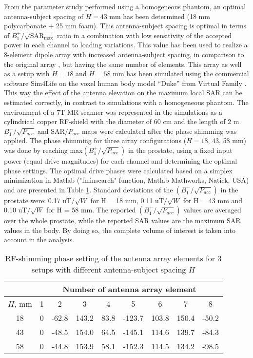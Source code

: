 \documentclass[fleqn,10pt]{wlscirep}
\begin{document}
From the parameter study performed using a homogeneous phantom, an optimal antenna-subject spacing of $H=43$ mm has been determined (18 mm polycarbonate + 25 mm foam). This antenna-subject spacing is optimal in terms of $B_1^{+}/\sqrt{\text{SAR}_{\text{max}}}$ ratio in a combination with low sensitivity of the accepted power in each channel to loading variations. This value has been used to realize a 8-element dipole array with increased antenna-subject spacing, in comparison to the original array \cite{Fractionated}, but having the same number of elements. This array as well as a setup with $H=18$ and $H=58$ mm has been simulated using the commercial software Sim4Life \cite{Sim4life} on the voxel human body model “Duke” from Virtual Family \cite{Virt_family}. This way the effect of the antenna elevation on the maximum local SAR can be estimated correctly, in contrast to simulations with a homogeneous phantom. The environment of a 7T MR scanner was represented in the simulations as a cylindrical copper RF-shield with the diameter of 60 cm and the length of 2 m. $B_1^{+}/{\sqrt{P_{acc}}}$ and SAR$/P_{acc}$ maps were calculated after the phase shimming was applied. The phase shimming for three array configurations ($H = 18$, 43, 58 mm) was done by reaching max$(B_1^{+}/{\sqrt{P_{acc}}})$ in the prostate, using a fixed input power (equal drive magnitudes) for each channel and determining the optimal phase settings. The optimal drive phases were calculated based on a simplex minimization in Matlab ("fminsearch" function, Matlab Mathworks, Natick, USA) and are presented in Table \ref{TabShim}. Standard deviations of the $(B_1^{+}/{\sqrt{P_{acc}}})$ in the prostate were: 0.17 uT$/{\sqrt{W}}$ for H = 18 mm, 0.11 uT$/{\sqrt{W}}$ for H = 43 mm and 0.10 uT$/{\sqrt{W}}$ for H = 58 mm. The reported $(B_1^{+}/{\sqrt{P_{acc}}})$ values are averaged over the whole prostate, while the reported SAR values are the maximum SAR values in the body. By doing so, the complete volume of interest is taken into account in the analysis.
%
\begin{table}
\caption{RF-shimming phase setting of the antenna array elements for 3 setups with different antenna-subject spacing $H$}
\centering
\begin{tabular}{|c|c|c|c|c|c|c|c|c|} 
    \cline{2-9}
    \multicolumn{1}{c|}{} & \multicolumn{8}{c|}{Number of antenna array element}\\ 
    \hline
    $H$, mm & 1 & 2 & 3 & 4 & 5 & 6 & 7 & 8\\
    \hline
    18 & 0 & -62.8 & 143.2 & 83.8 & -123.7 & 103.8 & 150.4 & -50.2\\
    43 & 0 & -48.5 & 154.0 & 64.5 & -145.1 & 114.6 & 139.7 & -84.3\\
    58 & 0 & -44.8 & 153.9 & 58.1 & -152.3 & 114.5 & 134.2 & -98.5\\
    \hline                  
\end{tabular}
\label{TabShim}
\end{table}
%
\end{document}
